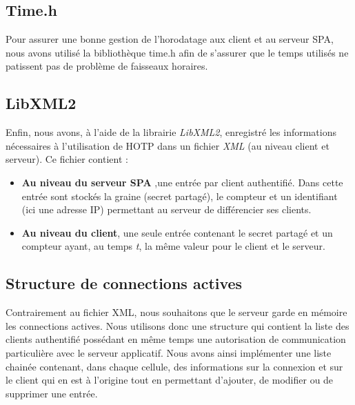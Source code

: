 \subsection{Time.h}
Pour assurer une bonne gestion de l'horodatage aux client et au serveur SPA, nous avons utilisé la bibliothèque time.h
 afin de s'assurer que le temps utilisés ne patissent pas de problème de faisseaux horaires.

\subsection{LibXML2}

Enfin, nous avons, à l'aide de la librairie \emph{LibXML2}, enregistré les informations nécessaires à l'utilisation de HOTP dans un fichier \emph{XML} (au niveau client et serveur).
Ce fichier contient :
\begin{itemize}
\item \textbf{Au niveau du serveur SPA} ,une entrée par client authentifié. Dans cette entrée sont stockés la graine (secret partagé), le compteur et un identifiant (ici une adresse IP) permettant au serveur de différencier ses clients.
\item \textbf{Au niveau du client}, une seule entrée contenant le secret partagé et un compteur ayant, au temps \emph{t}, la même valeur pour le client et le serveur.
\end{itemize}

\subsection{Structure de connections actives}

Contrairement au fichier XML, nous souhaitons que le serveur garde en mémoire les connections actives. Nous utilisons donc une structure qui contient la liste des clients authentifié possédant en même temps une autorisation de communication particulière avec le serveur applicatif. Nous avons ainsi implémenter une liste chainée contenant, dans chaque cellule, des informations sur la connexion et sur le client qui en est à l'origine tout en permettant d'ajouter, de modifier ou de supprimer une entrée.
